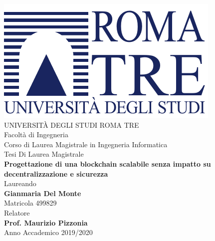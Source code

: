 \thispagestyle{empty}
\begin{center}
	\vspace{10mm}
	{\includegraphics[width=0.4 \linewidth]{img/uniroma3-logo}} \\
	\vspace{10mm}
	{\Large UNIVERSIT\`A DEGLI STUDI ROMA TRE} \\
	\vspace{5mm}
	{\Large Facolt\`a di Ingegneria} \\
	{\Large Corso di Laurea Magistrale in Ingegneria Informatica} \\
	\vspace{15mm}
	{\Large Tesi Di Laurea Magistrale} \\
	\vspace{15mm}
	{\Large \textbf{Progettazione di una blockchain scalabile senza impatto su decentralizzazione e sicurezza}} \\
	\vspace{15mm}
	{\large Laureando \\ \textbf{Gianmaria Del Monte} \\ Matricola 499829} \\
	\vspace{7mm}
	{\large Relatore \\ \textbf{Prof. Maurizio Pizzonia}} \\
	\vfill
	{\large Anno Accademico 2019/2020} \\
\end{center}
\newpage